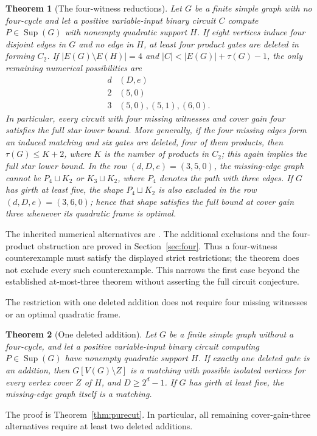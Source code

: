 \documentclass[11pt]{article}
\DeclareMathOperator{\Sup}{Sup}
\newtheorem{theorem}{Theorem}[section]
\theoremstyle{definition}
\begin{document}
\begin{theorem}[The four-witness reductions]\label{thm:four-summary}
Let $G$ be a finite simple graph with no four-cycle and let a positive variable-input binary circuit $C$ compute $P\in\Sup(G)$ with nonempty quadratic support $H$.
If eight vertices induce four disjoint edges in $G$ and no edge in $H$, at least four product gates are deleted in forming $C_2$.
If $|E(G)\setminus E(H)|=4$ and $|C|<|E(G)|+\tau(G)-1$, the only remaining numerical possibilities are
\[
\begin{array}{c|l}
 d&(D,e)\\\hline
 2&(5,0)\\
 3&(5,0),(5,1),(6,0).
\end{array}
\]
In particular, every circuit with four missing witnesses and cover gain four satisfies the full star lower bound. More generally, if the four missing edges form an induced matching and six gates are deleted, four of them products, then $\tau(G)\le K+2$, where $K$ is the number of products in $C_2$; this again implies the full star lower bound. In the row $(d,D,e)=(3,5,0)$, the missing-edge graph cannot be $P_4\sqcup K_2$ or $K_3\sqcup K_2$, where $P_4$ denotes the path with three edges. If $G$ has girth at least five, the shape $P_4\sqcup K_2$ is also excluded in the row $(d,D,e)=(3,6,0)$; hence that shape satisfies the full bound at cover gain three whenever its quadratic frame is optimal.
\end{theorem}
The inherited numerical alternatives are \citet[Corollary~5.34]{Companion}. The additional exclusions and the four-product obstruction are proved in Section~\ref{sec:four}. Thus a four-witness counterexample must satisfy the displayed strict restrictions; the theorem does not exclude every such counterexample. This narrows the first case beyond the established at-most-three theorem without asserting the full circuit conjecture.

The restriction with one deleted addition does not require four missing witnesses or an optimal quadratic frame.
\begin{theorem}[One deleted addition]\label{thm:pure-summary}
Let $G$ be a finite simple graph without a four-cycle, and let a positive variable-input binary circuit computing $P\in\Sup(G)$ have nonempty quadratic support $H$. If exactly one deleted gate is an addition, then $G[V(G)\setminus Z]$ is a matching with possible isolated vertices for every vertex cover $Z$ of $H$, and $D\ge2^d-1$. If $G$ has girth at least five, the missing-edge graph itself is a matching.
\end{theorem}
The proof is Theorem~\ref{thm:purecut}. In particular, all remaining cover-gain-three alternatives require at least two deleted additions.
\end{document}
